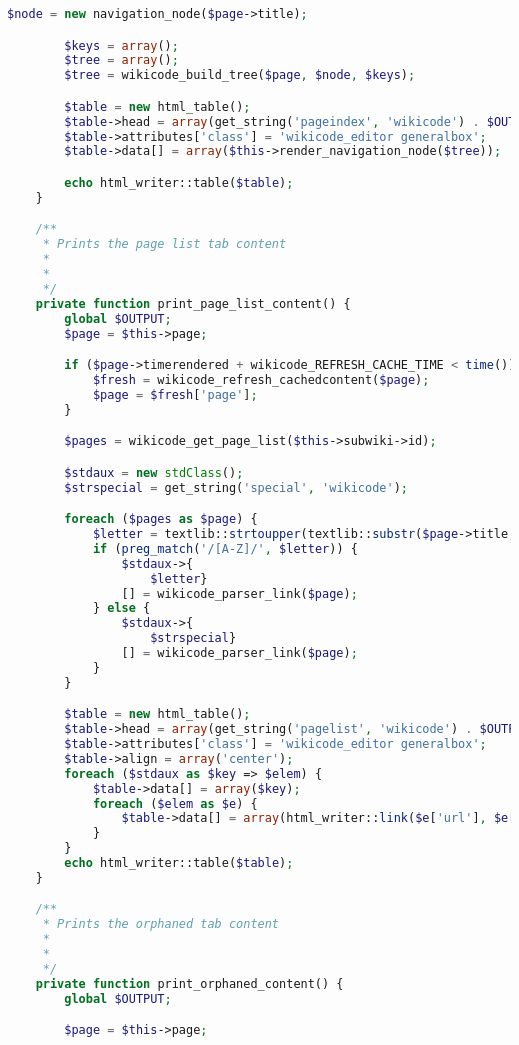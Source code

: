 \begin{lstlisting}[language=PHP]
        $node = new navigation_node($page->title);

        $keys = array();
        $tree = array();
        $tree = wikicode_build_tree($page, $node, $keys);

        $table = new html_table();
        $table->head = array(get_string('pageindex', 'wikicode') . $OUTPUT->help_icon('pageindex', 'wikicode'));
        $table->attributes['class'] = 'wikicode_editor generalbox';
        $table->data[] = array($this->render_navigation_node($tree));

        echo html_writer::table($table);
    }

    /**
     * Prints the page list tab content
     *
     *
     */
    private function print_page_list_content() {
        global $OUTPUT;
        $page = $this->page;

        if ($page->timerendered + wikicode_REFRESH_CACHE_TIME < time()) {
            $fresh = wikicode_refresh_cachedcontent($page);
            $page = $fresh['page'];
        }

        $pages = wikicode_get_page_list($this->subwiki->id);

        $stdaux = new stdClass();
        $strspecial = get_string('special', 'wikicode');

        foreach ($pages as $page) {
            $letter = textlib::strtoupper(textlib::substr($page->title, 0, 1));
            if (preg_match('/[A-Z]/', $letter)) {
                $stdaux->{
                    $letter}
                [] = wikicode_parser_link($page);
            } else {
                $stdaux->{
                    $strspecial}
                [] = wikicode_parser_link($page);
            }
        }

        $table = new html_table();
        $table->head = array(get_string('pagelist', 'wikicode') . $OUTPUT->help_icon('pagelist', 'wikicode'));
        $table->attributes['class'] = 'wikicode_editor generalbox';
        $table->align = array('center');
        foreach ($stdaux as $key => $elem) {
            $table->data[] = array($key);
            foreach ($elem as $e) {
                $table->data[] = array(html_writer::link($e['url'], $e['content']));
            }
        }
        echo html_writer::table($table);
    }

    /**
     * Prints the orphaned tab content
     *
     *
     */
    private function print_orphaned_content() {
        global $OUTPUT;

        $page = $this->page;


\end{lstlisting}
